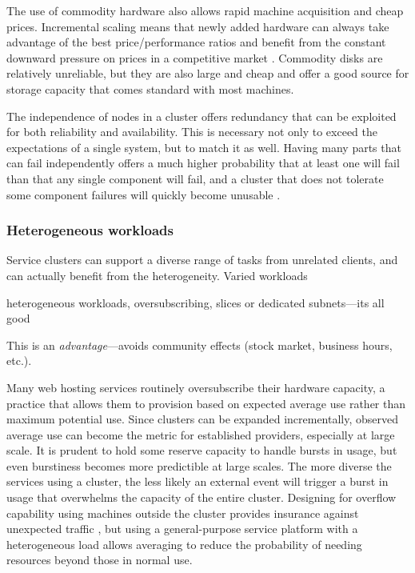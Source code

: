 The use of commodity hardware also allows rapid machine acquisition and cheap prices. Incremental scaling means that newly added hardware can always take advantage of the best price/performance ratios and benefit from the constant downward pressure on prices in a competitive market \cite{fox}. Commodity disks are relatively unreliable, but they are also large and cheap and offer a good source for storage capacity \cite{patterson,warfield} that comes standard with most machines.

The independence of nodes in a cluster offers redundancy that can be exploited for both reliability and availability. This is necessary not only to exceed the expectations of a single system, but to match it as well. Having many parts that can fail independently offers a much higher probability that at least one will fail than that any single component will fail, and a cluster that does not tolerate some component failures will quickly become unusable \cite{birrell93}.

\subsubsection{Heterogeneous workloads}

Service clusters can support a diverse range of tasks from unrelated clients, and can actually benefit from the heterogeneity. Varied workloads 

heterogeneous workloads, oversubscribing, slices or dedicated subnets---its all good


This is an \emph{advantage}---avoids community effects (stock market, business hours, etc.).

Many web hosting services routinely oversubscribe their hardware capacity, a practice that allows them to provision based on expected average use rather than maximum potential use. Since clusters can be expanded incrementally, observed average use can become the metric for established providers, especially at large scale. It is prudent to hold some reserve capacity to handle bursts in usage, but even burstiness becomes more predictible at large scales. The more diverse the services using a cluster, the less likely an external event will trigger a burst in usage that overwhelms the capacity of the entire cluster. Designing for overflow capability using machines outside the cluster provides insurance against unexpected traffic \cite{fox}, but using a general-purpose service platform with a heterogeneous load allows averaging to reduce the probability of needing resources beyond those in normal use.

